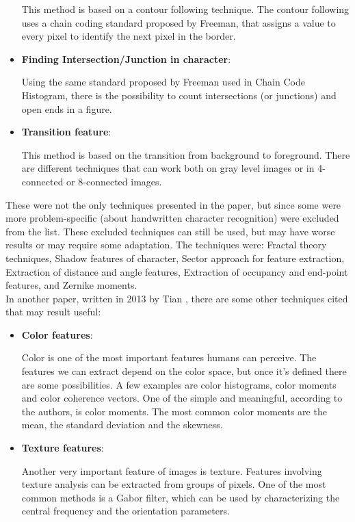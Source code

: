 \documentclass[conference]{IEEEtran}
\begin{document}
\begin{itemize}
						This method is based on a contour following technique. 
						The contour following uses a chain coding standard proposed by Freeman, that assigns a value to every pixel to identify the next pixel in the border.

					\item \textbf{Finding Intersection/Junction in character}:
					
						Using the same standard proposed by Freeman used in Chain Code Histogram, there is the possibility to count intersections (or junctions) and open ends in a figure.					
						
					\item \textbf{Transition feature}:
					
						This method is based on the transition from background to foreground. 
						There are different techniques that can work both on gray level images or in 4-connected or 8-connected images.
					
				\end{itemize}
			
			
			\noindent These were not the only techniques presented in the paper, but since some were more problem-specific (about handwritten character recognition)
			were excluded from the list. These excluded techniques can still be used, but may have worse results or may require some adaptation. 
			The techniques were: Fractal theory techniques, Shadow features of character, Sector approach for feature extraction, 
			Extraction of distance and angle features, Extraction of occupancy and end-point features, and Zernike moments.\\
			In another paper, written in 2013 by Tian \cite{3}, there are some other techniques cited that may result useful:
			
			\begin{itemize}
			
				\item \textbf{Color features}:
					
					Color is one of the most important features humans can perceive. 
					The features we can extract depend on the color space, but once it's defined there are some possibilities. 
					A few examples are color histograms, color moments and color coherence vectors. 
					One of the simple and meaningful, according to the authors, is color moments. 
					The most common color moments are the mean, the standard deviation and the skewness. 
					
				\item \textbf{Texture features}:
				
					Another very important feature of images is texture. 
					Features involving texture analysis can be extracted from groups of pixels. 
					One of the most common methods is a Gabor filter, which can be used by characterizing the central frequency and the orientation parameters.
			
			\end{itemize}
			
\end{document}
